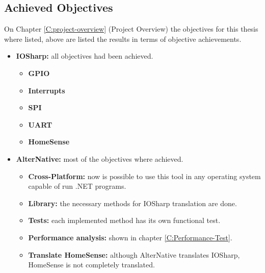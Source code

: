 \subsection{Achieved Objectives}\label{Conclusions-objectives}
On Chapter \ref{C:project-overview} (Project Overview) the objectives for this thesis where listed, above are listed the results in terms of objective achievements.
\begin{itemize}
	\item \textbf{IOSharp:} all objectives had been achieved.
		\begin{itemize}
		\item \textbf{GPIO}
		\item \textbf{Interrupts}
		\item \textbf{SPI}
		\item \textbf{UART}
		\item \textbf{HomeSense}
		\end{itemize}
	\item \textbf{AlterNative:} most of the objectives where achieved.
		\begin{itemize}
		\item \textbf{Cross-Platform:} now is possible to use this tool in any operating system capable of run .NET programs.
		\item \textbf{Library:} the necessary methods for IOSharp translation are done.
		\item \textbf{Tests:} each implemented method has its own functional test.
		\item \textbf{Performance analysis:} shown in chapter \ref{C:Performance-Test}.
		\item \textbf{Translate HomeSense:} although AlterNative translates IOSharp, HomeSense is not completely translated.
		\end{itemize}
\end{itemize}

